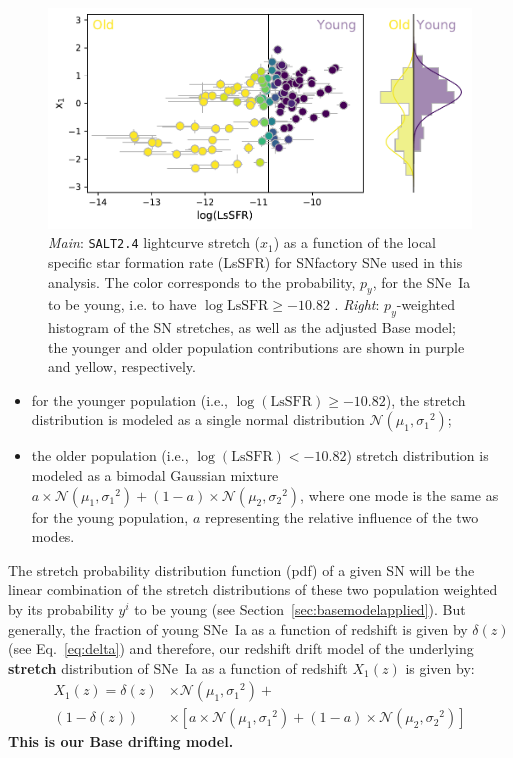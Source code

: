 \documentclass[]{aa}
\begin{document}
\begin{figure}
    \centering
    \includegraphics[width=0.8\linewidth]{Article_figures/model_base_hist.pdf}
    \caption{\textit{Main}: \textsc{\texttt{SALT2.4}} lightcurve stretch ($x_1$)
        as a function of the local specific star formation rate (LsSFR) for
        SNfactory SNe used in this analysis. The color corresponds to the
        probability, $p_y$, for the SNe~Ia to be young, i.e. to have
        $\log\mathrm{LsSFR} \geq -10.82$ \citep[see][]{rigault2020}.
        \textit{Right}: $p_y$-weighted histogram of the SN stretches, as well as
        the adjusted Base model; the younger and older population contributions
        are shown in purple and yellow, respectively.}
    \label{fig:stretchlssfr}
\end{figure}

\begin{itemize}
    \item for the younger population (i.e., $\log(\mathrm{LsSFR})\geq-10.82$),
        the stretch distribution is modeled as a single normal distribution
        $\mathcal{N}(\mu_1, \sigma_1{}^2)$; 
    \item the older population (i.e., $\log( \mathrm{LsSFR})<-10.82$) stretch
        distribution is modeled as a bimodal Gaussian mixture $a\times
        \mathcal{N}(\mu_1, \sigma_1{}^2) + (1-a)\times \mathcal{N}(\mu_2,
        \sigma_2{}^2)$, where one mode is the same as for the young population,
        $a$ representing the relative influence of the two modes.
\end{itemize}

The stretch probability distribution function (pdf) of a given SN will be the
linear combination of the stretch distributions of these two population weighted
by its probability $y^i$ to be young (see Section~\ref{sec:basemodelapplied}).
But generally, the fraction of young SNe~Ia as a function of redshift is given
by $\delta(z)$ (see Eq.~\ref{eq:delta}) and therefore, our redshift drift model
of the underlying \textbf{stretch} distribution of SNe~Ia as a function of redshift $X_1(z)$ is
given by:
\begin{align}\label{eq:stretchz}
    X_1(z) = \delta(z)&\times \mathcal{N}(\mu_1,\sigma_1{}^2) + \nonumber \\
    (1-\delta(z))&\times \left[ a\times\mathcal{N}(\mu_1,\sigma_1{}^2) +
    (1-a)\times\mathcal{N}(\mu_2,\sigma_2{}^2) \right]
\end{align}
\textbf{This is our Base drifting model.}
\end{document}
